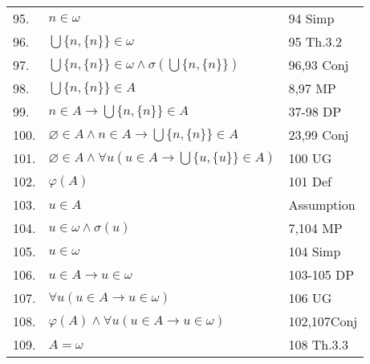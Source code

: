\documentclass[12pt, a4paper]{article}
\begin{document}
\begin{table}[h!]
\begin{center}
\begin{tabular}{l l l}
        95.& \hspace{10mm}$n\in\omega$ & 94 Simp\\
        
        96.& \hspace{10mm}$\bigcup\{n,\{n\}\}\in\omega$ & 95 Th.3.2\\
        
        97.& \hspace{10mm}$\bigcup\{n,\{n\}\}\in\omega\wedge\sigma(\bigcup\{n,\{n\}\})$ & 96,93 Conj\\
        
        98.& \hspace{10mm}$\bigcup\{n,\{n\}\}\in A$ & 8,97 MP\\
        
        99.& $n\in A\rightarrow\bigcup\{n,\{n\}\}\in A$ & 37-98 DP\\
        
        100.&$\varnothing\in A\wedge n\in A\rightarrow\bigcup\{n,\{n\}\}\in A$ & 23,99 Conj\\
        
        101.&$\varnothing\in A\wedge\forall u(u\in A\rightarrow\bigcup\{u,\{u\}\}\in A)$ & 100 UG\\
        
        102.&$\varphi(A)$ & 101 Def\\
        
        103.&$u\in A$ & Assumption\\
        
        104.&\hspace{10mm}$u\in\omega\wedge\sigma(u)$ & 7,104 MP\\
        
        105.&\hspace{10mm}$u\in\omega$ & 104 Simp\\
        
        106.&$u\in A\rightarrow u\in\omega$ & 103-105 DP\\
        
        107.&$\forall u(u\in A\rightarrow u\in\omega)$ & 106 UG\\
        
        108.&$\varphi(A)\wedge\forall u(u\in A\rightarrow u\in\omega)$ & 102,107Conj\\
        
        109.&$A=\omega$ & 108 Th.3.3\\
        
        
        \hline
        \end{tabular}
    \end{center}
\end{table}
\end{document}
